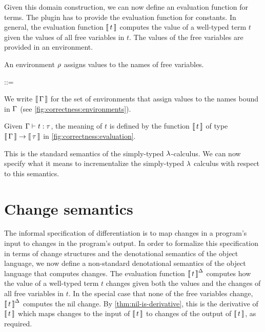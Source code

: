 Given this domain
construction, we can now define an evaluation function for
terms. The plugin has to provide the evaluation function for
constants. In general, the evaluation function $\Eval{t}$ computes the value of a
well-typed term $t$ given the values of all free variables in
$t$. The values of the free variables are provided in an
environment.

\begin{definition}[Environments]
  An environment $\rho$ assigns values to the names of free
  variables.

  \begin{syntax}
    \Gr ::= \EmptyContext \mid {}
  \end{syntax}

  We write $\Eval{\GG}$ for the set of environments that assign
  values to the names bound in $\Gamma$ (see
  \cref{fig:correctness:environments}).
\end{definition}

\begin{definition}[Evaluation]
  \label{def:evaluation}
  Given $\Typing{t}{\tau}$, the meaning of $t$ is defined by the
  function $\Eval{t}$ of type $\Fun{\Eval{\GG}}{\Eval{\tau}}$
  in \cref{fig:correctness:evaluation}.
\end{definition}

This is the standard semantics of the simply-typed
$\lambda$-calculus.
We can now specify what it means to incrementalize the
simply-typed $\lambda$ calculus with respect to this semantics.

\section{Change semantics}
The informal specification of differentiation is to map
changes in a program's input to changes in the program's
output. In order to formalize this specification in terms of
change structures and the denotational semantics of the object
language,
we now define a non-standard denotational semantics of the object
language that computes changes. The evaluation function
$\EvalInc{t}$ computes how the value of a well-typed term $t$
changes given both the values and the changes of all free
variables in $t$.
In the special case that none of the free variables change,
$\EvalInc{t}$ computes the nil change. By
\cref{thm:nil-is-derivative}, this is the derivative of
$\Eval{t}$ which maps changes to the input of $\Eval{t}$ to
changes of the output of $\Eval{t}$, as required.

